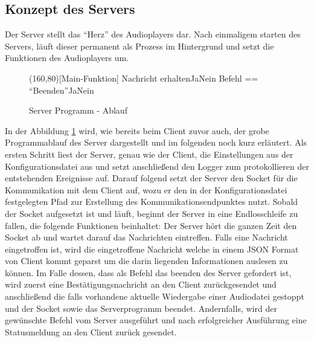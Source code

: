 \subsection{Konzept des Servers}

Der Server stellt das \enquote{Herz} des Audioplayers dar. Nach einmaligem
starten des Servers, läuft dieser permanent als Prozess im Hintergrund und
setzt die Funktionen des Audioplayers um.

\begin{figure}[H]
    \begin{struktogramm}(160,80)[Main-Funktion] 
        	 {Nachricht erhalten}{Ja}{Nein}
        	     {Befehl == \enquote{Beenden}}{Ja}{Nein}
        	    	\change
        	    \ifend
        		\change
        	\ifend
        \whileend
    \end{struktogramm} 
\caption{Server Programm - Ablauf} 
\label{lst:server_ablauf} 
\end{figure}

In der Abbildung \ref{lst:server_ablauf} wird, wie bereits beim Client zuvor
auch, der grobe Programmablauf des Server dargestellt und im folgenden noch
kurz erläutert. Als ersten Schritt liest der Server, genau wie der Client, die
Einstellungen aus der Konfigurationsdatei aus und setzt anschließend den Logger
zum protokollieren der entstehenden Ereignisse auf. Darauf folgend setzt der
Server den Socket für die Kommunikation mit dem Client auf, wozu er den in der
Konfigurationsdatei festgelegten Pfad zur Erstellung des
Kommunikationsendpunktes nutzt. Sobald der Socket aufgesetzt ist und läuft,
beginnt der Server in eine Endlosschleife zu fallen, die folgende Funktionen
beinhaltet: Der Server hört die ganzen Zeit den Socket ab und wartet darauf das
Nachrichten eintreffen. Falls eine Nachricht eingetroffen ist, wird die
eingetroffene Nachricht welche in einem \ac{JSON} Format von Client kommt
geparst um die darin liegenden Informationen auslesen zu können. Im Falle
dessen, dass als Befehl das beenden des Server gefordert ist, wird zuerst eine
Bestätigungsnachricht an den Client zurückgesendet und anschließend die falls
vorhandene aktuelle Wiedergabe einer Audiodatei gestoppt und der Socket sowie
das Serverprogramm beendet. Andernfalls, wird der gewünschte Befehl vom Server
ausgeführt und nach erfolgreicher Ausführung eine Statusmeldung an den Client
zurück gesendet.
	


